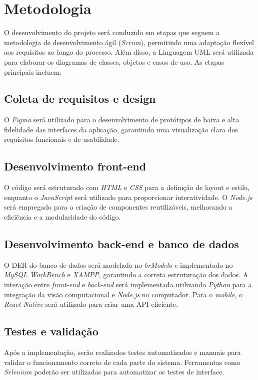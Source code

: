 \section{Metodologia}

O desenvolvimento do projeto será conduzido em etapas que seguem a metodologia de desenvolvimento ágil (\textit{Scrum}), permitindo uma adaptação flexível aos requisitos ao longo do processo. Além disso, a Linguagem UML será utilizada para elaborar os diagramas de classes, objetos e casos de uso. As etapas principais incluem:

\subsection{Coleta de requisitos e design}
O \textit{Figma} será utilizado para o desenvolvimento de protótipos de baixa e alta fidelidade das interfaces da aplicação, garantindo uma visualização clara dos requisitos funcionais e de usabilidade.

\subsection{Desenvolvimento front-end}
O código será estruturado com \textit{HTML} e \textit{CSS} para a definição de layout e estilo, enquanto o \textit{JavaScript} será utilizado para proporcionar interatividade. O \textit{Node.js} será empregado para a criação de componentes reutilizáveis, melhorando a eficiência e a modularidade do código.

\subsection{Desenvolvimento back-end e banco de dados}
O DER do banco de dados será modelado no \textit{brModelo} e implementado no \textit{MySQL WorkBench} e \textit{XAMPP}, garantindo a correta estruturação dos dados. A interação entre \textit{front-end} e \textit{back-end} será implementada utilizando \textit{Python} para a integração da visão computacional e \textit{Node.js} no computador. Para o \textit{mobile}, o \textit{React Native} será utilizado para criar uma API eficiente.

\subsection{Testes e validação}
Após a implementação, serão realizados testes automatizados e manuais para validar o funcionamento correto de cada parte do sistema. Ferramentas como \textit{Selenium} poderão ser utilizadas para automatizar os testes de interface.

